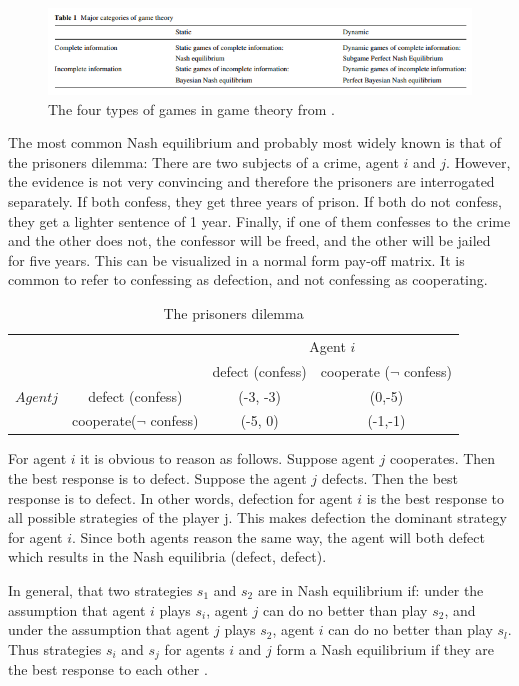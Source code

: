 \begin{figure}[h]
	\centering
	\includegraphics[width=0.9\linewidth]{img/major_categories_of_game_theory}
	\caption{The four types of games in game theory from \citet{trappey2013multi}.}
	\label{fig:majorcategoriesofgametheory}
\end{figure}
The most common Nash equilibrium and probably most widely known is that of the prisoners dilemma:
There are two subjects of a crime, agent $i$ and $j$. However, the evidence is not very convincing and therefore the prisoners are interrogated separately. If both confess, they get three years of prison. If both do not confess, they get a lighter sentence of 1 year. Finally, if one of them confesses to the crime and the other does not, the confessor will be freed, and the other will be jailed for five years.
This can be visualized in a normal form pay-off matrix. It is common to refer to confessing as defection, and not confessing as cooperating.
\begin{table}[h]

\begin{tabular}{|c|c|c|c|}
	\hline 
		&  				& \multicolumn{2}{c}{Agent $i$}\\ 
	 	&				& defect (confess) 	& cooperate ($\neg$ confess) \\ 
	$Agent j$	& defect (confess)	&  	(-3, -3)			& (0,-5) \\ 
		& cooperate($\neg $ confess) 	&  (-5, 0)				& (-1,-1) \\ 
	\hline 
\end{tabular} \label{tab:nashprison} \caption{The prisoners dilemma}
\end{table}
For agent $i$ it is obvious to reason as follows. Suppose agent $j$ cooperates. Then the best response is to defect. Suppose the agent $j$ defects. Then the best response is to defect. In other words, defection for agent $i$ is the best response to all possible strategies of the player j. This makes defection the dominant strategy for agent $i$. Since both agents reason the same way, the agent will both defect which results in the Nash equilibria (defect, defect).

In general, that two strategies $s_1$ and $s_2$ are in Nash equilibrium if: under the assumption that agent $i$ plays $s_i$, agent $j$ can do no better than play $s_2$, and under the assumption that agent $j$ plays $s_2$, agent $i$ can do no better than play $s_l$. Thus strategies $s_i$ and $s_j$ for agents $i$ and $j$ form a Nash equilibrium if they are the best response to each other  \citep{wooldridge2009introduction}. 

